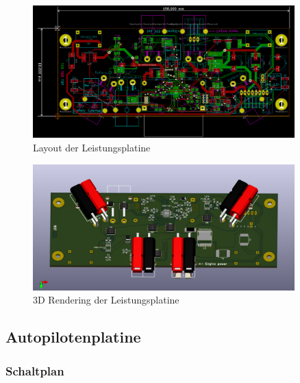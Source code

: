 \begin{figure}[H]
\centering
\includegraphics[width=0.9\textwidth]{bilder/Centerbox/Centerbox-Front-Power_AUVSI_2016_rev-01_layout.png} 
\caption{Layout der Leistungsplatine} 
\label{fig:Layout der Leistungsplatine}
\end{figure}

\begin{figure}[H]
\centering
\includegraphics[width=0.9\textwidth]{bilder/Centerbox/Centerbox-Front-Power_AUVSI_2016_rev-01-3D.png} 
\caption{3D Rendering der Leistungsplatine} 
\label{fig:3D Rendering der Leistungsplatine}
\end{figure}

\subsection{Autopilotenplatine}

\subsubsection{Schaltplan}

\newpage

